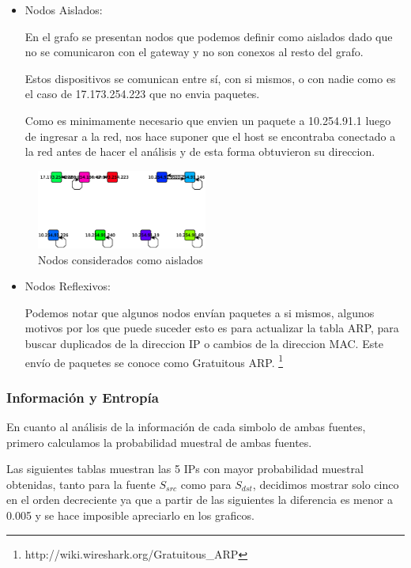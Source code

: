 \begin{itemize}

\item Nodos Aislados:

\par En el grafo se presentan nodos que podemos definir como aislados dado que no se comunicaron con el gateway y no son conexos  al resto del grafo.
    
\par Estos dispositivos se comunican entre sí, con si mismos, o con nadie como es el caso de 17.173.254.223 que no envia paquetes.

\par  Como es minimamente necesario que envien un paquete a 10.254.91.1 luego de ingresar a la red, nos hace suponer que el host se encontraba conectado a la red antes de hacer el análisis y de esta forma obtuvieron su direccion.  
\end{itemize}

\begin{figure}[H]
		\centering
		\includegraphics[width=0.5\textwidth]{img/graph/escenario_3/nodos_aislados.eps}
		\caption{Nodos considerados como aislados}
		\label{fig:aislados_escenario3}
\end{figure}


\begin{itemize}
\item Nodos Reflexivos:
\par Podemos notar que algunos nodos envían paquetes a si mismos, algunos motivos por los que puede suceder esto es para actualizar la tabla ARP, para buscar duplicados de la direccion IP o cambios de la direccion MAC. Este envío de paquetes se conoce como Gratuitous ARP.  \footnote{http://wiki.wireshark.org/Gratuitous\_ARP}
\end{itemize}

\subsubsection{Informaci\'on y Entrop\'ia}
		        
	\par En cuanto al análisis de la información de cada simbolo de ambas fuentes, primero calculamos la probabilidad muestral de ambas fuentes.
	\par Las siguientes tablas muestran las 5 IPs con mayor probabilidad muestral obtenidas, tanto para la fuente $S_{src}$ como para $S_{dst}$, decidimos mostrar solo cinco en el orden decreciente ya que a partir de las siguientes la diferencia es menor a 0.005 y se hace imposible apreciarlo en los graficos.

